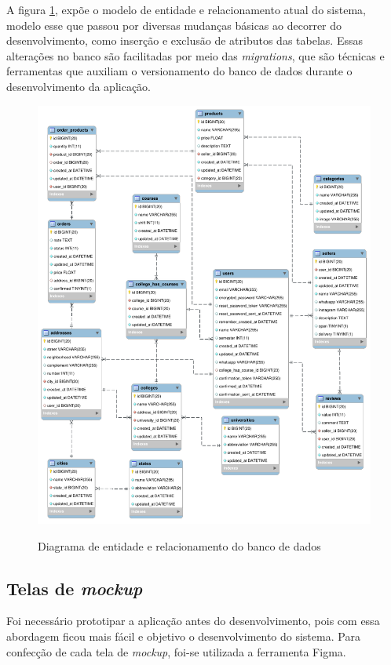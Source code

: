 A figura \ref{fig:err}, expõe o modelo de entidade e relacionamento atual do sistema, modelo esse que passou por diversas mudanças básicas ao decorrer do desenvolvimento, como inserção e exclusão de atributos das tabelas. Essas alterações no banco são facilitadas por meio das \textit{migrations}, que são técnicas e ferramentas que auxiliam o versionamento do banco de dados durante o desenvolvimento da aplicação.

\begin{figure}[htbp!]
  \centering
  \caption{Diagrama de entidade e relacionamento do banco de dados}
  \includegraphics[width=1\textwidth]{figs/err.png}
    \label{fig:err}
\end{figure}

\subsection{Telas de \textit{mockup}}\label{mockup}
Foi necessário prototipar a aplicação antes do desenvolvimento, pois com essa abordagem ficou mais fácil e objetivo o desenvolvimento do sistema. Para confecção de cada tela de \textit{mockup}, foi-se utilizada a ferramenta Figma.

